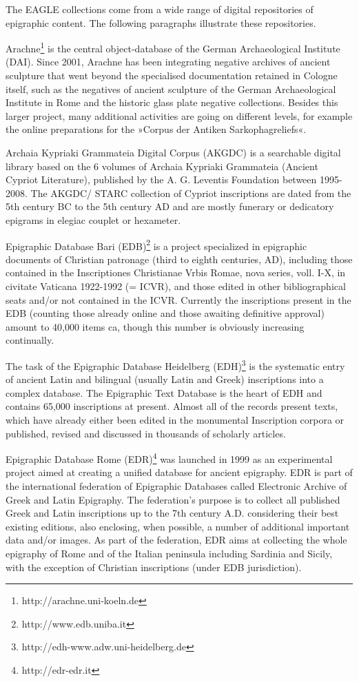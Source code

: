 \documentclass[amsthm,ebook]{saparticle}
\begin{document}
The EAGLE collections come from a wide range of digital repositories of epigraphic content. The following paragraphs
illustrate these repositories.

Arachne\footnote{ http://arachne.uni-koeln.de } is the central object-database of the German Archaeological Institute
(DAI). Since 2001, Arachne has been integrating negative archives of ancient sculpture that went beyond the specialised
documentation retained in Cologne itself, such as the negatives of ancient sculpture of the German Archaeological
Institute in Rome and the historic glass plate negative collections. Besides this larger project, many additional
activities are going on different levels, for example the online preparations for the »Corpus der Antiken
Sarkophagreliefs«.

Archaia Kypriaki Grammateia Digital Corpus (AKGDC) is a searchable digital library based on the 6 volumes of Archaia
Kypriaki Grammateia (Ancient Cypriot Literature), published by the A. G. Leventis Foundation between 1995-2008. The
AKGDC/ STARC collection of Cypriot inscriptions are dated from the 5th century BC to the 5th century AD and are mostly
funerary or dedicatory epigrams in elegiac couplet or hexameter.

Epigraphic Database Bari (EDB)\footnote{ http://www.edb.uniba.it } is a project specialized in epigraphic documents of
Christian patronage (third to eighth centuries, AD), including those contained in the Inscriptiones Christianae Vrbis
Romae, nova series, voll. I-X, in civitate Vaticana 1922-1992 (= ICVR), and those edited in other bibliographical seats
and/or not contained in the ICVR. Currently the inscriptions present in the EDB (counting those already online and
those awaiting definitive approval) amount to 40,000 items ca, though this number is obviously increasing continually. 

The task of the Epigraphic Database Heidelberg (EDH)\footnote{ http://edh-www.adw.uni-heidelberg.de } is the systematic
entry of ancient Latin and bilingual (usually Latin and Greek) inscriptions into a complex database. The Epigraphic
Text Database is the heart of EDH and contains 65,000 inscriptions at present. Almost all of the records present texts,
which have already either been edited in the monumental Inscription corpora or published, revised and discussed in
thousands of scholarly articles.

Epigraphic Database Rome (EDR)\footnote{ http://edr-edr.it } was launched in 1999 as an experimental project aimed at
creating a unified database for ancient epigraphy. EDR is part of the international federation of Epigraphic Databases
called Electronic Archive of Greek and Latin Epigraphy. The federation’s purpose is to collect all published Greek and
Latin inscriptions up to the 7th century A.D. considering their best existing editions, also enclosing, when possible,
a number of additional important data and/or images. As part of the federation, EDR aims at collecting the whole
epigraphy of Rome and of the Italian peninsula including Sardinia and Sicily, with the exception of Christian
inscriptions (under EDB jurisdiction).
\end{document}
